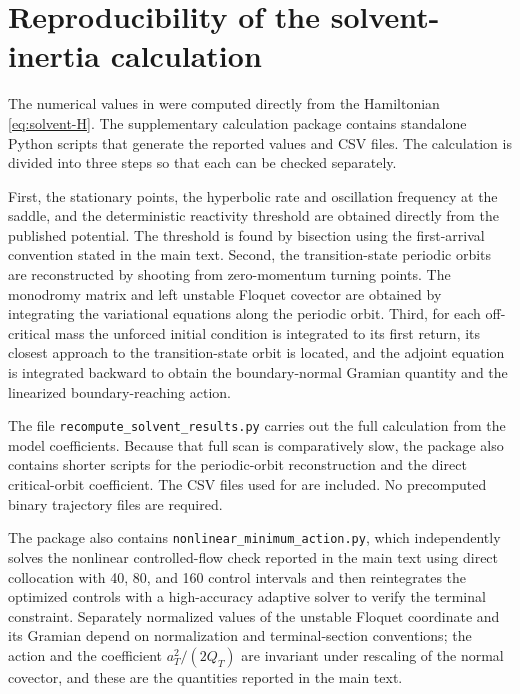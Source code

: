 \documentclass[11pt]{article}
\theoremstyle{definition}
\theoremstyle{remark}
\begin{document}
\appendix

\section{Reproducibility of the solvent-inertia calculation}
\label{app:solvent-numerics}

The numerical values in  were computed directly from the Hamiltonian \eqref{eq:solvent-H}.  The supplementary calculation package contains standalone Python scripts that generate the reported values and CSV files.  The calculation is divided into three steps so that each can be checked separately.

First, the stationary points, the hyperbolic rate and oscillation frequency at the saddle, and the deterministic reactivity threshold are obtained directly from the published potential.  The threshold is found by bisection using the first-arrival convention stated in the main text.  Second, the transition-state periodic orbits are reconstructed by shooting from zero-momentum turning points.  The monodromy matrix and left unstable Floquet covector are obtained by integrating the variational equations along the periodic orbit.  Third, for each off-critical mass the unforced initial condition is integrated to its first return, its closest approach to the transition-state orbit is located, and the adjoint equation is integrated backward to obtain the boundary-normal Gramian quantity and the linearized boundary-reaching action.

The file \texttt{recompute\_solvent\_results.py} carries out the full calculation from the model coefficients.  Because that full scan is comparatively slow, the package also contains shorter scripts for the periodic-orbit reconstruction and the direct critical-orbit coefficient.  The CSV files used for  are included.  No precomputed binary trajectory files are required.

The package also contains \texttt{nonlinear\_minimum\_action.py}, which independently solves the nonlinear controlled-flow check reported in the main text using direct collocation with 40, 80, and 160 control intervals and then reintegrates the optimized controls with a high-accuracy adaptive solver to verify the terminal constraint.  Separately normalized values of the unstable Floquet coordinate and its Gramian depend on normalization and terminal-section conventions; the action and the coefficient $a_T^2/(2Q_T)$ are invariant under rescaling of the normal covector, and these are the quantities reported in the main text.
\end{document}
